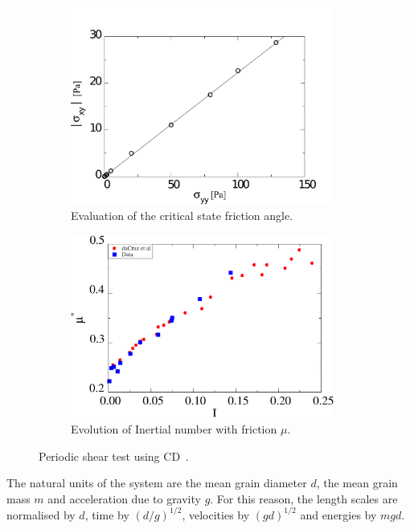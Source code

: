 \begin{figure}[tbhp]
\centering
\begin{subfigure}[t]{0.475\textwidth}
\includegraphics[width=0.95\textwidth]{Sxy_vs_Syy_Slope}
\caption{Evaluation of the critical state friction angle.}
\label{fig:Sxy_vs_Syy_Slope}
\end{subfigure}
%
\begin{subfigure}[t]{0.475\textwidth}
\includegraphics[width=0.95\textwidth]{mu_vs_I}
\caption{Evolution of Inertial number with friction $\mu$.}
\label{fig:mu_vs_I}
\end{subfigure}
\caption{Periodic shear test using CD~\citep{Mutabaruka2013}.}
\label{fig:Shear_Test_Slope}
\end{figure}

The natural units of the system 
are the mean grain diameter $d$, the mean grain 
mass $m$ and acceleration due to gravity $g$. For this reason, the length 
scales are normalised by $d$, time by $(d/g)^{1/2}$, velocities by $(gd)^{1/2}$ 
and energies by $mgd$. 


